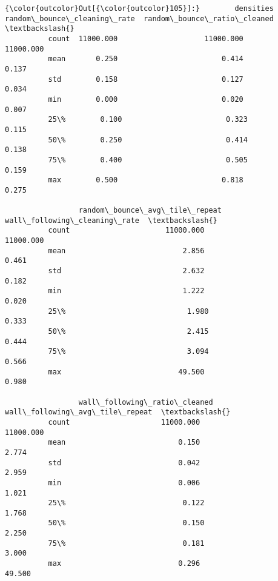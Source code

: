 \documentclass[11pt]{article}
\begin{document}
\begin{Verbatim}[commandchars=\\\{\}]
{\color{outcolor}Out[{\color{outcolor}105}]:}        densities  random\_bounce\_cleaning\_rate  random\_bounce\_ratio\_cleaned  \textbackslash{}
          count  11000.000                    11000.000                    11000.000   
          mean       0.250                        0.414                        0.137   
          std        0.158                        0.127                        0.034   
          min        0.000                        0.020                        0.007   
          25\%        0.100                        0.323                        0.115   
          50\%        0.250                        0.414                        0.138   
          75\%        0.400                        0.505                        0.159   
          max        0.500                        0.818                        0.275   
          
                 random\_bounce\_avg\_tile\_repeat  wall\_following\_cleaning\_rate  \textbackslash{}
          count                      11000.000                     11000.000   
          mean                           2.856                         0.461   
          std                            2.632                         0.182   
          min                            1.222                         0.020   
          25\%                            1.980                         0.333   
          50\%                            2.415                         0.444   
          75\%                            3.094                         0.566   
          max                           49.500                         0.980   
          
                 wall\_following\_ratio\_cleaned  wall\_following\_avg\_tile\_repeat  \textbackslash{}
          count                     11000.000                       11000.000   
          mean                          0.150                           2.774   
          std                           0.042                           2.959   
          min                           0.006                           1.021   
          25\%                           0.122                           1.768   
          50\%                           0.150                           2.250   
          75\%                           0.181                           3.000   
          max                           0.296                          49.500   
          

\end{Verbatim}
\end{document}
